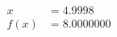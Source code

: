 \documentclass[preview]{standalone}
\begin{document}
\begin{align*}
x &= 4.9998\\f(x) &= 8.0000000
\end{align*}
\end{document}
